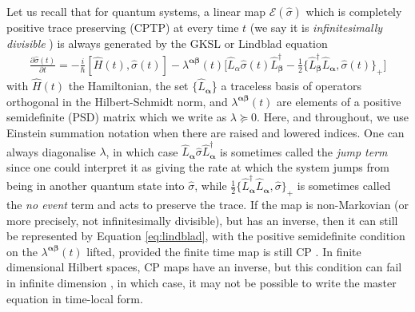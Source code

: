 \documentclass[aps,pra,showpacs,citeautoscript,amsmath,amssymb,floatfix,superscriptaddress,bbm, verbatim,amsfonts,changes,11pt,nofootinbib,longbibliography]{revtex4-2}
\newcommand{\ag}{{\boldsymbol\alpha}}
\newcommand{\bg}{{\boldsymbol\beta}}
\def\L{{\hat{L}}}
\begin{document}
Let us recall that for quantum systems,
a linear map $\mathcal{E}(\hat{\sigma})$  which is completely positive trace preserving (CPTP) at every time $t$ (we say it is {\it infinitesimally divisible} \cite{wolf2008dividing}) is always generated by the GKSL or Lindblad equation \cite{GKS76,Lindblad76}
\begin{align}
\frac{\partial\hat{\sigma}(t)}{\partial t}=-\frac{i}{\hbar}[\hat{H}(t) ,\hat{\sigma}(t)]-\lambda^{\ag\bg}(t)\big[\L_\alpha\hat{\sigma}(t)\L_\bg^\dagger-\frac{1}{2}\{\L_\bg^\dagger\L_\ag,\hat{\sigma}(t)\}_+\big]
\label{eq:lindblad}
\end{align}
with ${ \hat{H}(t)}$ the Hamiltonian, the set $\{\L_\ag$\} a traceless basis of operators orthogonal in the Hilbert-Schmidt norm, and $\lambda^{\ag\bg}(t)$ are elements of a positive semidefinite (PSD) matrix which we write as $\lambda\succeq 0$. Here, and throughout, we use Einstein summation notation when there are raised and lowered indices. One can always diagonalise $\lambda$, in which case $\L_\ag\hat{\sigma}\L_\ag^\dagger$ is sometimes called the {\it jump term} since one could interpret it as giving the rate at which
the system jumps from being in another quantum state into $\hat{\sigma}$, while 
$\frac{1}{2}\{\L_\ag^\dagger\L_\ag,\hat{\sigma}\}_+$ is sometimes called the {\it no event} term and acts to preserve the trace. If the map is non-Markovian (or more precisely, not infinitesimally divisible), but has an inverse, then it can still be represented by Equation \eqref{eq:lindblad}, with the positive semidefinite condition on the $\lambda^{\ag\bg}(t)$ lifted, provided the finite time map is still CP \cite{time-local}. In finite dimensional Hilbert spaces, CP maps have an inverse, but this condition can fail in infinite dimension \cite{buzek1998reconstruction,breuer1999stochastic}, in which case, it may not be possible to write the master equation in time-local form.
\end{document}
